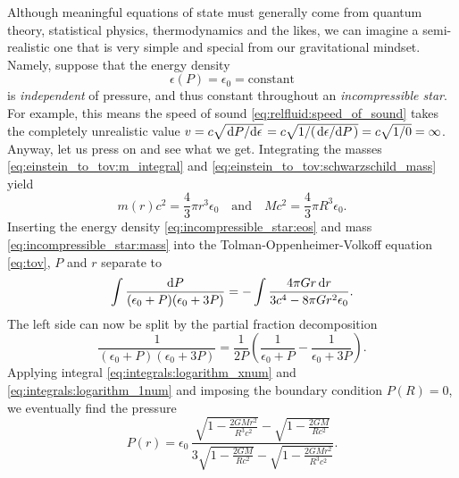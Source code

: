 
Although meaningful equations of state must generally come from quantum theory, statistical physics, thermodynamics and the likes, we can imagine a semi-realistic one that is very simple and special from our gravitational mindset.
Namely, suppose that the energy density
\begin{equation}
	\epsilon(P) = \epsilon_0 = \text{constant}
\label{eq:incompressible_star:eos}
\end{equation}
is \emph{independent} of pressure, and thus constant throughout an \emph{incompressible star}.
For example, this means the speed of sound \eqref{eq:relfluid:speed_of_sound} takes the completely unrealistic value $v = c \sqrt{\odv{P}/{\epsilon}} = c \sqrt{1/(\odv{\epsilon}/{P})} = c \sqrt{1/0} = \infty$.
Anyway, let us press on and see what we get.
Integrating the masses \eqref{eq:einstein_to_tov:m_integral} and \eqref{eq:einstein_to_tov:schwarzschild_mass} yield
\begin{equation}
	m(r) c^2 = \frac{4}{3} \pi r^3 \epsilon_0 
	\quad \text{and} \quad
	M c^2 = \frac{4}{3} \pi R^3 \epsilon_0 
	.
\label{eq:incompressible_star:mass}
\end{equation}
Inserting the energy density \eqref{eq:incompressible_star:eos} and mass \eqref{eq:incompressible_star:mass} into the Tolman-Oppenheimer-Volkoff equation \eqref{eq:tov}, $P$ and $r$ separate to
\begin{equation}
	\int \frac{\mathop{}\!\mathrm{d} P}{(\epsilon_0+P)(\epsilon_0+3P)} = - \int \frac{4 \pi G r \mathop{}\!\mathrm{d} r}{3 c^4 - 8\pi G r^2 \epsilon_0} .
\end{equation}
The left side can now be split by the partial fraction decomposition
\begin{equation}
	\frac{1}{(\epsilon_0+P)(\epsilon_0+3P)} = \frac{1}{2P} \left( \frac{1}{\epsilon_0+P} - \frac{1}{\epsilon_0+3P} \right) .
\end{equation}
Applying integral \eqref{eq:integrals:logarithm_xnum} and \eqref{eq:integrals:logarithm_1num} and imposing the boundary condition $P(R) = 0$, we eventually find the pressure
\begin{equation}
	P(r) = \epsilon_0 \, \frac{\sqrt{1-\frac{2GMr^2}{R^3c^2}} - \sqrt{1-\frac{2GM}{Rc^2}}}{3 \sqrt{1-\frac{2GM}{Rc^2}} - \sqrt{1-\frac{2GMr^2}{R^3c^2}}} .
	\label{eq:incompressible_star:pressure}
\end{equation}
